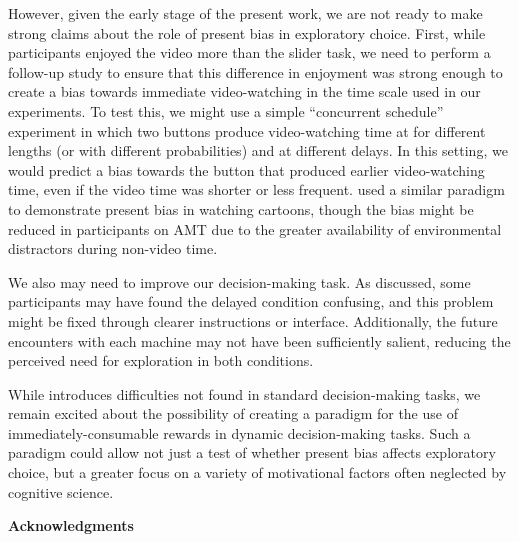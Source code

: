 \documentclass[10pt,letterpaper]{article}
\begin{document}
However, given the early stage of the present work, we are not ready to make
strong claims about the role of present bias in exploratory choice. First, while
participants enjoyed the video more than the slider task, we need to perform a
follow-up study to ensure that this difference in enjoyment was strong enough to
create a bias towards immediate video-watching in the time scale used in our
experiments. To test this, we might use a simple ``concurrent schedule''
experiment in which two buttons produce video-watching time at for different
lengths (or with different probabilities) and at different delays. In this
setting, we would predict a bias towards the button that produced earlier
video-watching time, even if the video time was shorter or less frequent.
\citet{Navarick1998} used a similar paradigm to demonstrate present bias in
watching cartoons, though the bias might be reduced in participants on AMT due
to the greater availability of environmental distractors during non-video time.

We also may need to improve our decision-making task. As discussed, some
participants may have found the delayed condition confusing, and this problem
might be fixed through clearer instructions or interface. Additionally, the
future encounters with each machine may not have been sufficiently salient,
reducing the perceived need for exploration in both conditions.

While introduces difficulties not found in standard decision-making tasks, we
remain excited about the possibility of creating a paradigm for the use of
immediately-consumable rewards in dynamic decision-making tasks. Such a paradigm
could allow not just a test of whether present bias affects exploratory choice,
but a greater focus on a variety of motivational factors often neglected by
cognitive science.

\begin{small}
  \noindent
\textbf{Acknowledgments} 
\end{small}



\end{document}
